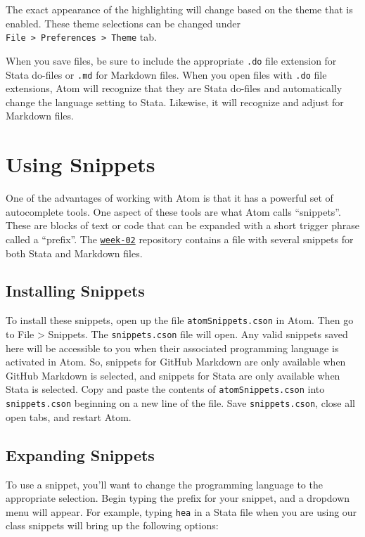 \documentclass[]{book}
\theoremstyle{definition}
\theoremstyle{definition}
\theoremstyle{definition}
\theoremstyle{remark}
\begin{document}
The exact appearance of the highlighting will change based on the theme
that is enabled. These theme selections can be changed under
\texttt{File\ \textgreater{}\ Preferences\ \textgreater{}\ Theme} tab.

When you save files, be sure to include the appropriate \texttt{.do}
file extension for Stata do-files or \texttt{.md} for Markdown files.
When you open files with \texttt{.do} file extensions, Atom will
recognize that they are Stata do-files and automatically change the
language setting to Stata. Likewise, it will recognize and adjust for
Markdown files.

\section{Using Snippets}\label{using-snippets}

One of the advantages of working with Atom is that it has a powerful set
of autocomplete tools. One aspect of these tools are what Atom calls
``snippets''. These are blocks of text or code that can be expanded with
a short trigger phrase called a ``prefix''. The
\href{https://github.com/slu-soc5650/week-02}{\texttt{week-02}}
repository contains a file with several snippets for both Stata and
Markdown files.

\subsection{Installing Snippets}\label{installing-snippets}

To install these snippets, open up the file \texttt{atomSnippets.cson}
in Atom. Then go to File \textgreater{} Snippets. The
\texttt{snippets.cson} file will open. Any valid snippets saved here
will be accessible to you when their associated programming language is
activated in Atom. So, snippets for GitHub Markdown are only available
when GitHub Markdown is selected, and snippets for Stata are only
available when Stata is selected. Copy and paste the contents of
\texttt{atomSnippets.cson} into \texttt{snippets.cson} beginning on a
new line of the file. Save \texttt{snippets.cson}, close all open tabs,
and restart Atom.

\subsection{Expanding Snippets}\label{expanding-snippets}

To use a snippet, you'll want to change the programming language to the
appropriate selection. Begin typing the prefix for your snippet, and a
dropdown menu will appear. For example, typing \texttt{hea} in a Stata
file when you are using our class snippets will bring up the following
options:
\end{document}
